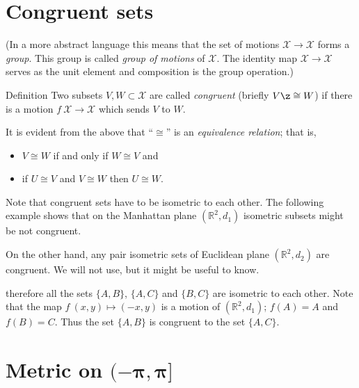 \section*{Congruent sets}



(In a more abstract language this means that  the set of motions $\mathcal X\to\mathcal X$ forms a {}\emph{group}.
This group is called \emph{group of motions} of $\mathcal X$.
The identity map $\mathcal X\to\mathcal X$ serves as the unit element  and composition is the group operation.)

\begin{thm}{Definition}
Two subsets $V,W\subset \mathcal X$ are called \emph{congruent} (briefly \index{$\cong$}$V\z\cong W$)
if there is a motion $f\:\mathcal X\to\mathcal X$ which sends $V$ to $W$.
\end{thm}

It is evident from the above that ``$\cong$'' is an  \emph{equivalence relation};
that is, 
\begin{itemize}
\item $V\cong W$ if and only if $W\cong V$ and 
\item if $U\cong V$ and $V\cong W$ then $U\cong W$.
\end{itemize}


Note that congruent sets have to be isometric to each other.
The following example shows that on the Manhattan plane $(\mathbb{R}^2,d_1)$ isometric subsets might be not congruent.

On the other hand,
any pair isometric sets of Euclidean plane $(\mathbb{R}^2,d_2)$ are congruent.
We will not use, but it might be useful to know.



therefore all the sets $\{A,B\}$, $\{A,C\}$ and $\{B,C\}$ are isometric to each other.
Note that the map $f\:(x,y)\mapsto (-x,y)$ is a motion of $(\mathbb{R}^2,d_1)$; 
$f(A)=A$ and $f(B)=C$.
Thus the set $\{A,B\}$ is congruent to the set $\{A,C\}$.









\section*{Metric on $\bm{(-\pi,\pi]}$}
\addtocontents{toc}{Metric on $(-\pi,\pi]$.}

